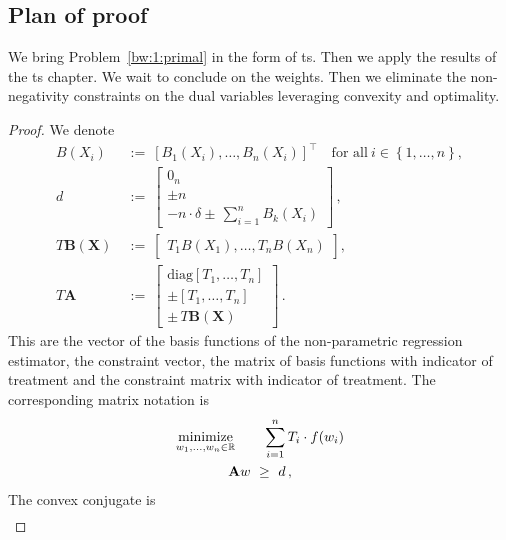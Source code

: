 \subsection*{Plan of proof}
We bring 
  Problem~\ref{bw:1:primal}
  in the form of ts.
  Then we apply the results of the ts chapter.
  We wait to conclude on the weights.
  Then we eliminate the non-negativity constraints
  on the dual variables leveraging convexity and optimality.
\begin{proof}
We denote
\begin{align*}
    B(X_i)
    &
    \ 
    :=
    \ 
    \left[ 
      B_1(X_i)
      ,
      \ldots
      ,
      B_n(X_i)
    \right]
    ^\top
    \quad
    \text{for all}
    \ 
    i\in
    \left\{ 1,\ldots,n \right\}
    ,
    \\
d
    &
    \ 
    :=
    \ 
    \begin{bmatrix}
      0_n
      \\
      \pm n
      \\
      -n\cdot\delta 
      \pm\,
      \sum_{i = 1}^{n} B_k(X_i)
    \end{bmatrix}
    \,,
    \\
    T\mathbf{B}(\mathbf{X})
    &
    \ 
    :=
    \ 
    \begin{bmatrix}
      T_1B(X_1), \ldots, T_nB(X_n)
    \end{bmatrix}
    ,
    \\
    T\mathbf{A}
    &
    \ 
    :=
    \ 
    \begin{bmatrix}
      \mathrm{diag}
      [T_1,\ldots,T_n]
      \\
      \pm
      [T_1,\ldots,T_n]
      \\
      \pm\,T\mathbf{B}(\mathbf{X})
    \end{bmatrix}
        \,.
  \end{align*}
  This are the vector of the basis functions of the non-parametric regression estimator, the constraint vector,
  the matrix of basis functions with indicator of treatment and 
  the constraint matrix with indicator of treatment.
    The corresponding matrix notation is
 \begin{gather*}
    \underset{w_1, \ldots, w_n \in \R}{\mathrm{minimize}}
    \qquad
    \sum_{i = 1}^{n} T_i \cdot f(w_i)
    \\
    \mathbf{A}w 
    \ 
    \ge
    \ 
    d
    \,,
\end{gather*}
The convex conjugate is
\begin{gather*}

\end{gather*}
\end{proof}
